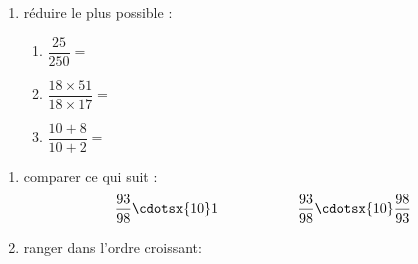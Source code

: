 \documentclass[a4paper,12pt]{article}
\begin{document}
\begin{exo}
\begin{enumerate}[font=\bfseries]
		\item réduire le plus possible :
\begin{enumerate}[label={\alph* =}]
\item $\dfrac{25}{250}=$\anserline[1]
\item $\dfrac{18\times 51}{18 \times 17}=$\anserline[1]
\item $\dfrac{10+8}{10+2}=$\anserline[1]
\end{enumerate}
\end{enumerate}		
\end{exo}

\begin{exo}
\begin{enumerate}[font=\bfseries]
		\item comparer ce qui suit  :	
$$\dfrac{93}{98}\cdotsx{10} 1 \hspace{1cm}   \hspace{1cm}
\dfrac{93}{98}\cdotsx{10}\dfrac{98}{93}$$

\item ranger dans l'ordre croissant:
\end{enumerate}

\end{exo}
\end{document}
